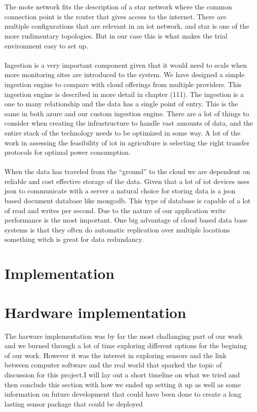 \documentclass[]{uiophd}
\begin{document}
\\\\
The mote network fits the description of a star network where the common connection point is the router that gives access to the internet. There are multiple configurations that are relevant in an iot network, and star is one of the more rudimentary topologies. But in our case this is what makes the trial environment easy to set up.
\\\\
Ingestion is a very important component given that it would need to scale when more monitoring sites are introduced to the system. We have designed a simple ingestion engine to compare with cloud offerings from multiple providers. This ingestion engine is described in more detail in chapter (111). The ingestion is a one to many relationship and the data has a single point of entry. This is the same in both azure and our custom ingestion engine. There are a lot of things to consider when creating the infrastructure to handle vast amounts of data, and the entire stack of the technology needs to be optimized in some way. A lot of the work in assessing the feasibility of iot in agriculture is selecting the right transfer protocols for optimal power consumption.
\\\\
 When the data has traveled from the “ground” to the cloud we are dependent on reliable and cost effective storage of the data. Given that a lot of iot devices uses json to communicate with a server a natural choice for storing data is a json based document database like mongodb. This type of database is capable of a lot of read and writes per second. Due to the nature of our application write performance is the most important. One big advantage of cloud based data base systems is that they often do automatic replication over multiple locations something witch is great for data redundancy.
 
\section{Implementation}
\section{Hardware implementation}
The harware implementation was by far the most challanging part of our work and we burned through a lot of time exploring different options for the begining of our work. However it was the interest in exploring sensors and the link between computer software and the real world that sparked the topic of discussion for this project.I will lay out a short timeline on what we tried and then conclude this section with how we ended up setting it up as well as some information on future development that could have been done to create a long lasting sensor package that could be deployed 
\end{document}
